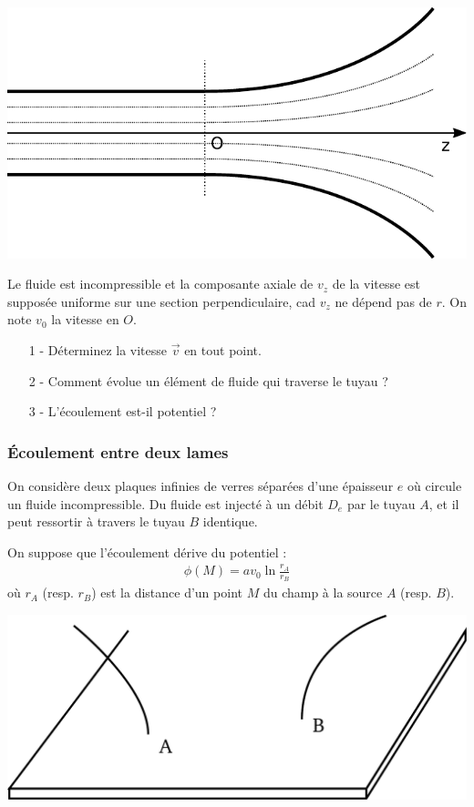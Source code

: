 \documentclass{report}
\begin{document}
\begin{center}
	\includegraphics[scale=0.5]{meca_flu1.pdf}
\end{center}

Le fluide est incompressible et la composante axiale de $v_z$ de la vitesse est supposée uniforme sur une section perpendiculaire, cad $v_z$ ne dépend pas de $r$. On note $v_0$ la vitesse en $O$.

\begin{itemize}
	\item[1 - ] Déterminez la vitesse $\vec{v}$ en tout point.
	\item[2 - ] Comment évolue un élément de fluide qui traverse le tuyau ? 
	\item[3 - ] L'écoulement est-il potentiel ?
\end{itemize}

\subsubsection*{Écoulement entre deux lames}

On considère deux plaques infinies de verres séparées d'une épaisseur $e$ où circule un fluide incompressible. Du fluide est injecté à un débit $D_e$ par le tuyau $A$, et il peut ressortir à travers le tuyau $B$ identique. 

On suppose que l'écoulement dérive du potentiel :
\begin{align*}
	\phi(M) = av_0\ln\frac{r_A}{r_B}
\end{align*}
où $r_A$ (resp. $r_B$) est la distance d'un point $M$ du champ à la source $A$ (resp. $B$).

\begin{center}
	\includegraphics[scale=0.25]{plaque.pdf}
\end{center}
\end{document}
